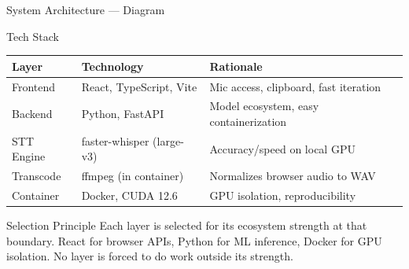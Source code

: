 \documentclass{beamer}
\begin{document}
\begin{frame}{System Architecture --- Diagram}
\begin{center}
    \end{center}
\end{frame}


\begin{frame}{Tech Stack}
    \begin{table}
    \centering\small
    \begin{tabular}{@{} p{1.5cm} p{3.6cm} p{4.8cm} @{}}
        \toprule
        \textbf{Layer} & \textbf{Technology} & \textbf{Rationale} \\
        \midrule
        Frontend   & React, TypeScript, Vite  & Mic access, clipboard, fast iteration \\
        Backend    & Python, FastAPI           & Model ecosystem, easy containerization \\
        STT Engine & faster-whisper (large-v3) & Accuracy/speed on local GPU \\
        Transcode  & ffmpeg (in container)     & Normalizes browser audio to WAV \\
        Container  & Docker, CUDA 12.6         & GPU isolation, reproducibility \\
        \bottomrule
    \end{tabular}
    \end{table}

    \vspace{0.4em}
    \begin{block}{Selection Principle}
        Each layer is selected for its ecosystem strength at that boundary.
        React for browser APIs, Python for ML inference, Docker for GPU
        isolation. No layer is forced to do work outside its strength.
    \end{block}
\end{frame}
\end{document}
